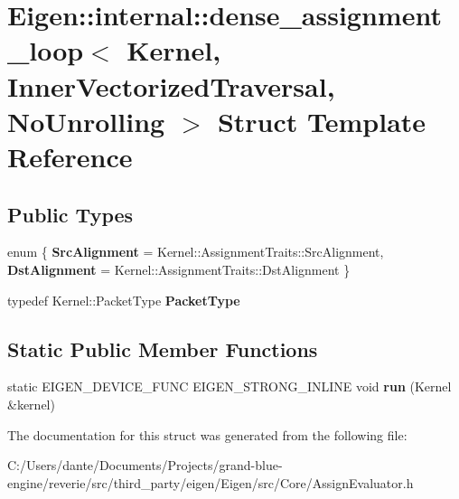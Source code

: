 \hypertarget{struct_eigen_1_1internal_1_1dense__assignment__loop_3_01_kernel_00_01_inner_vectorized_traversal_00_01_no_unrolling_01_4}{}\section{Eigen\+::internal\+::dense\+\_\+assignment\+\_\+loop$<$ Kernel, Inner\+Vectorized\+Traversal, No\+Unrolling $>$ Struct Template Reference}
\label{struct_eigen_1_1internal_1_1dense__assignment__loop_3_01_kernel_00_01_inner_vectorized_traversal_00_01_no_unrolling_01_4}
\subsection*{Public Types}
\begin{DoxyCompactItemize}
\item 
\mbox{\label{struct_eigen_1_1internal_1_1dense__assignment__loop_3_01_kernel_00_01_inner_vectorized_traversal_00_01_no_unrolling_01_4_aa2328d6fe133ea7769932e11a9f72cb6}} 
enum \{ {\bfseries Src\+Alignment} = Kernel\+::Assignment\+Traits\+::Src\+Alignment, 
{\bfseries Dst\+Alignment} = Kernel\+::Assignment\+Traits\+::Dst\+Alignment
 \}
\item 
\mbox{\label{struct_eigen_1_1internal_1_1dense__assignment__loop_3_01_kernel_00_01_inner_vectorized_traversal_00_01_no_unrolling_01_4_a0e154e1ab2f981d932c579fe98be7057}} 
typedef Kernel\+::\+Packet\+Type {\bfseries Packet\+Type}
\end{DoxyCompactItemize}
\subsection*{Static Public Member Functions}
\begin{DoxyCompactItemize}
\item 
\mbox{\label{struct_eigen_1_1internal_1_1dense__assignment__loop_3_01_kernel_00_01_inner_vectorized_traversal_00_01_no_unrolling_01_4_a3f9af6ccbdafdfc7e2e8545c0683ca30}} 
static E\+I\+G\+E\+N\+\_\+\+D\+E\+V\+I\+C\+E\+\_\+\+F\+U\+NC E\+I\+G\+E\+N\+\_\+\+S\+T\+R\+O\+N\+G\+\_\+\+I\+N\+L\+I\+NE void {\bfseries run} (Kernel \&kernel)
\end{DoxyCompactItemize}


The documentation for this struct was generated from the following file\+:\begin{DoxyCompactItemize}
\item 
C\+:/\+Users/dante/\+Documents/\+Projects/grand-\/blue-\/engine/reverie/src/third\+\_\+party/eigen/\+Eigen/src/\+Core/Assign\+Evaluator.\+h\end{DoxyCompactItemize}
